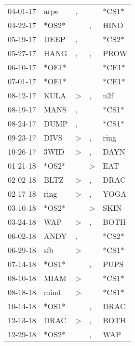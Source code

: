 \begin{supertabular}{lllll}
 04-01-17 &   arpe &                , &                  &  *CS1* \\
 04-22-17 &  *OS2* &                  &                , &   HIND \\
 05-19-17 &   DEEP &                , &                  &  *CS2* \\
 05-27-17 &   HANG &                , &                , &   PROW \\
 06-10-17 &  *OE1* &                  &                  &  *CE1* \\
 07-01-17 &  *OE1* &                  &                  &  *CE1* \\
 08-12-17 &   KULA &     \textgreater &                , &    n2f \\
 08-19-17 &   MANS &                , &                  &  *CS1* \\
 08-24-17 &   DUMP &                , &                  &  *CS1* \\
 09-23-17 &   DIVS &     \textgreater &                , &   ring \\
 10-26-17 &   3WID &     \textgreater &                , &   DAYN \\
 01-21-18 &  *OS2* &                  &     \textgreater &    EAT \\
 02-02-18 &   BLTZ &     \textgreater &                , &   DRAC \\
 02-17-18 &   ring &     \textgreater &                , &   YOGA \\
 03-10-18 &  *OS2* &                  &     \textgreater &   SKIN \\
 03-24-18 &    WAP &     \textgreater &                , &   BOTH \\
 06-02-18 &   ANDY &                , &                  &  *CS2* \\
 06-29-18 &    sfb &     \textgreater &                  &  *CS1* \\
 07-14-18 &  *OS1* &                  &                , &   PUPS \\
 08-10-18 &   MIAM &     \textgreater &                  &  *CS1* \\
 08-18-18 &   mind &     \textgreater &                  &  *CS1* \\
 10-14-18 &  *OS1* &                  &                , &   DRAC \\
 12-13-18 &   DRAC &     \textgreater &                , &   BOTH \\
 12-29-18 &  *OS2* &                  &                , &    WAP \\

\end{supertabular}
